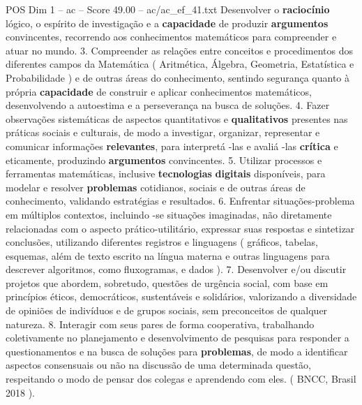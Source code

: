 \begin{textsample}{POS Dim 1 – ac – Score 49.00 – ac/ac\_ef\_41.txt}
Desenvolver o \textbf{raciocínio} lógico, o espírito de investigação e a \textbf{capacidade} de produzir \textbf{argumentos} convincentes, recorrendo aos conhecimentos matemáticos para compreender e atuar no mundo. 3.
Compreender as relações entre conceitos e procedimentos dos diferentes campos da Matemática ( Aritmética, Álgebra, Geometria, Estatística e Probabilidade ) e de outras áreas do conhecimento, sentindo segurança quanto à própria \textbf{capacidade} de construir e aplicar conhecimentos matemáticos, desenvolvendo a autoestima e a perseverança na busca de soluções. 4.
Fazer observações sistemáticas de aspectos quantitativos e \textbf{qualitativos} presentes nas práticas sociais e culturais, de modo a investigar, organizar, representar e comunicar informações \textbf{relevantes}, para interpretá -las e avaliá -las \textbf{crítica} e eticamente, produzindo \textbf{argumentos} convincentes. 5.
Utilizar processos e ferramentas matemáticas, inclusive \textbf{tecnologias} \textbf{digitais} disponíveis, para modelar e resolver \textbf{problemas} cotidianos, sociais e de outras áreas de conhecimento, validando estratégias e resultados. 6.
Enfrentar situações-problema em múltiplos contextos, incluindo -se situações imaginadas, não diretamente relacionadas com o aspecto prático-utilitário, expressar suas respostas e sintetizar conclusões, utilizando diferentes registros e linguagens ( gráficos, tabelas, esquemas, além de texto escrito na língua materna e outras linguagens para descrever algoritmos, como fluxogramas, e dados ). 7.
Desenvolver e/ou discutir projetos que abordem, sobretudo, questões de urgência social, com base em princípios éticos, democráticos, sustentáveis e solidários, valorizando a diversidade de opiniões de indivíduos e de grupos sociais, sem preconceitos de qualquer natureza. 8.
Interagir com seus pares de forma cooperativa, trabalhando coletivamente no planejamento e desenvolvimento de pesquisas para responder a questionamentos e na busca de soluções para \textbf{problemas}, de modo a identificar aspectos consensuais ou não na discussão de uma determinada questão, respeitando o modo de pensar dos colegas e aprendendo com eles. ( BNCC, Brasil 2018 ).

\end{textsample}
